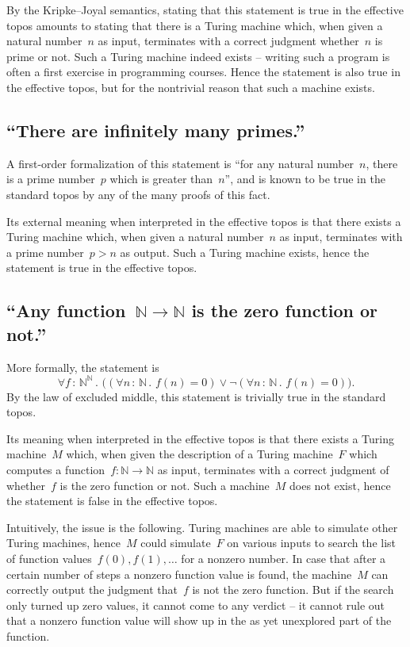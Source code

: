 \documentclass[oneside,reqno]{amsart}
\theoremstyle{definition}
\theoremstyle{plain}
\theoremstyle{remark}
\newcommand{\NN}{\mathbb{N}}
\renewcommand{\_}{\mathpunct{.}\,}
\newcommand{\effective}{ef{}fective\xspace}
\newcommand{\?}{\,{:}\,}
\begin{document}
By the Kripke--Joyal semantics, stating that this statement is true in the \effective topos
amounts to stating that there is a Turing machine which, when given a natural
number~$n$ as input, terminates with a correct judgment whether~$n$ is prime or
not. Such a Turing machine indeed exists -- writing such a program is often a
first exercise in programming courses. Hence the statement is also true in the
\effective topos, but for the nontrivial reason that such a machine exists.


\subsection{``There are infinitely many primes.''} A first-order formalization
of this statement is ``for any natural number~$n$, there is a prime
number~$p$ which is greater than~$n$'', and is known to be true in the standard
topos by any of the many proofs of this fact.

Its external meaning when interpreted in the \effective topos is that there exists
a Turing machine which, when given a natural number~$n$ as input, terminates with a
prime number~$p > n$ as output. Such a Turing machine exists, hence the
statement is true in the \effective topos.


\subsection{``Any function~$\NN \to \NN$ is the zero function or not.''} More
formally, the statement is
\[ \forall f \? \NN^\NN\_
  \bigl((\forall n \? \NN\_ f(n) = 0) \vee
  \neg
  (\forall n \? \NN\_ f(n) = 0)\bigr). \]
By the law of excluded middle, this statement is trivially true in the standard
topos.

Its meaning when interpreted in the \effective topos is that there exists a
Turing machine~$M$ which, when given the description of a Turing machine~$F$ which
computes a function~$f : \NN \to \NN$ as input, terminates with a correct
judgment of whether~$f$ is the zero function or not. Such a machine~$M$ does
not exist, hence the statement is false in the \effective topos.

Intuitively, the issue
is the following. Turing machines are able to simulate other Turing machines,
hence~$M$ could simulate~$F$ on various inputs to search the list of
function values~$f(0), f(1), \ldots$ for a nonzero number. In case that after
a certain number of steps a nonzero function value is found, the machine~$M$
can correctly output the judgment that~$f$ is not the zero function. But if the
search only turned up zero values, it cannot come to any verdict -- it cannot
rule out that a nonzero function value will show up in the as yet unexplored
part of the function.
\end{document}
